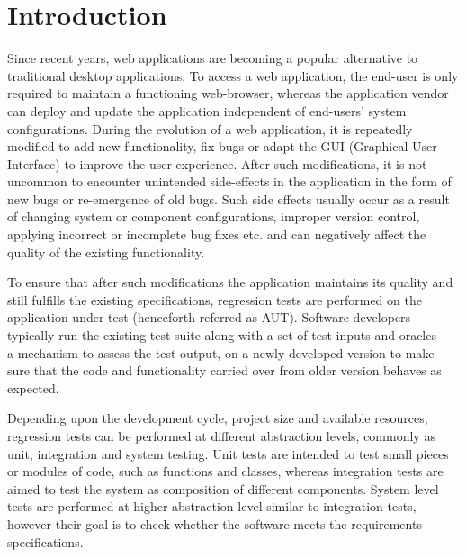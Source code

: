 \chapter{Introduction} %


\label{Chapter1} %

Since recent years, web applications are becoming a popular alternative to traditional desktop applications. To access a web application, the end-user is only required to maintain a functioning web-browser, whereas the application vendor can deploy and update the application independent of end-users’ system configurations. During the evolution of a web application, it is repeatedly modified to add new functionality, fix bugs or adapt the GUI (Graphical User Interface) to improve the user experience. After such modifications, it is not uncommon to encounter unintended side-effects in the application in the form of new bugs or re-emergence of old bugs. Such side effects usually occur as a result of changing system or component configurations, improper version control, applying incorrect or incomplete bug fixes etc. and can negatively affect the quality of the existing functionality. 

To ensure that after such modifications the application maintains its quality and still fulfills the existing specifications, regression tests are performed on the application under test (henceforth referred as AUT). Software developers typically run the existing test-suite along with a set of test inputs and oracles — a mechanism to assess the test output, on a newly developed version to make sure that the code and functionality carried over from older version behaves as expected.

Depending upon the development cycle, project size and available resources, regression tests can be performed at different abstraction levels, commonly as unit, integration and system testing. Unit tests are intended to test small pieces or modules of code, such as functions and classes, whereas integration tests are aimed to test the system as composition of different components. System level tests are performed at higher abstraction level similar to integration tests, however their goal is to check whether the software meets the requirements specifications. 

